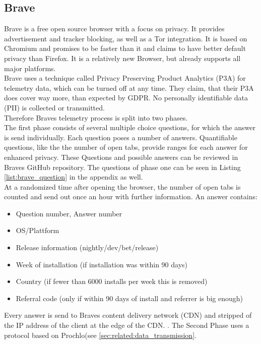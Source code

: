     \subsection{Brave}
        Brave is a free open source browser with a focus on privacy. It provides advertisement and tracker blocking, as well as a Tor integration. It is based on Chromium and promises to be faster than it and claims to have better default privacy than Firefox. It is a relatively new Browser, but already supports all major platforms\cite{brave_secure_nodate}.\\
        Brave uses a technique called Privacy Preserving Product Analytics (P3A) for telemetry data, which can be turned off at any time.
        They claim, that their P3A does cover way more, than expected by GDPR. No personally identifiable data (PII) is collected or transmitted.\\
        Therefore Braves telemetry process is split into two phases.\\
        The first phase consists of several multiple choice questions, for which the answer is send individually.
        Each question poses a number of answers. Quantifiable questions, like the the number of open tabs, provide ranges for each answer for enhanced privacy\cite{brave_privacy-preserving_2019}. These Questions and possible answers can be reviewed in Braves GitHub repository\cite{brave_software_inc_brave-browser_2019}.
        The questions of phase one can be seen in Listing \ref{list:brave_question} in the appendix as well.\\
        At a randomized time after opening the browser, the number of open tabs is counted and send out once an hour with further information\cite{brave_privacy-preserving_2019}.
        An answer contains:
        \begin{itemize}
            \item Question number, Answer number
            \item OS/Plattform
            \item Release information (nightly/dev/bet/release)
            \item Week of installation (if installation was within 90 days)
            \item Country (if fewer than 6000 installs per week this is removed)
            \item Referral code (only if within 90 days of install and referrer is big enough)
        \end{itemize}
        Every answer is send to Braves content delivery network (CDN) and stripped of the IP address of the client at the edge of the CDN\cite{brave_privacy-preserving_2019}.
        . 
        The Second Phase uses a protocol based on Prochlo(see \ref{sec:related:data_transmission}. 
        

